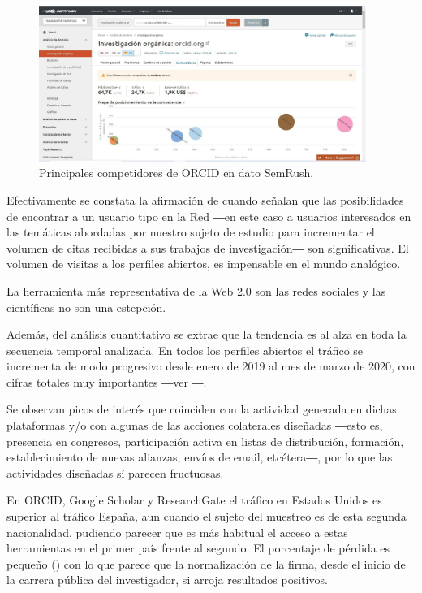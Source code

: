 \documentclass{textolivre}
\begin{document}
\begin{figure}[htbp]
 \centering
 \includegraphics[width=0.95\textwidth]{Fig04.png}
 \caption{Principales competidores de ORCID en dato SemRush.}
 \label{Fig04}
\end{figure}

Efectivamente se constata la afirmación de \textcite{sule_alonso_mk-2.0:_2010} %
cuando señalan que las posibilidades de encontrar a un usuario tipo en la Red ―en este caso a usuarios interesados en las temáticas abordadas por nuestro sujeto de estudio para incrementar el volumen de citas recibidas a sus trabajos de investigación― son significativas. El volumen de visitas a los perfiles abiertos, es impensable en el mundo analógico.

La herramienta más representativa de la Web 2.0 son las redes sociales \cite[p. 123]{arroyo-almaraz_community_2018} y las científicas no son una estepción.

Además, del análisis cuantitativo se extrae que la tendencia es al alza en toda la secuencia temporal analizada. En todos los perfiles abiertos el tráfico se incrementa de modo progresivo desde enero de 2019 al mes de marzo de 2020, con cifras totales muy importantes ―ver ―.

Se observan picos de interés que coinciden con la actividad generada en dichas plataformas y/o con algunas de las acciones colaterales diseñadas ―esto es, presencia en congresos, participación activa en listas de distribución, formación, establecimiento de nuevas alianzas, envíos de email, etcétera―, por lo que las actividades diseñadas sí parecen fructuosas.

En ORCID, Google Scholar y ResearchGate el tráfico en Estados Unidos es superior al tráfico España, aun cuando el sujeto del muestreo es de esta segunda nacionalidad, pudiendo parecer que es más habitual el acceso a estas herramientas en el primer país frente al segundo.
El porcentaje de pérdida es pequeño () con lo que parece que la normalización de la firma, desde el inicio de la carrera pública del investigador, si arroja resultados positivos.
\end{document}
